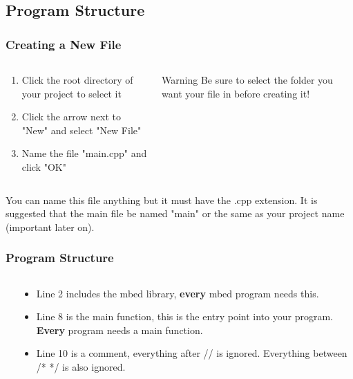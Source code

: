 \subsection{Program Structure}
\label{sub:program_structure}
\begin{frame}
	\frametitle{Creating a New File}
	\begin{columns}[c]
		\begin{column}{0.5\textwidth}
			\begin{enumerate}
				\item Click the root directory of your project to select it
				\item Click the arrow next to "New" and select "New File"
				\item Name the file "main.cpp" and click "OK"
			\end{enumerate}
		\end{column}
		\begin{column}{0.5\textwidth}
			\begin{block}{Warning}
				Be sure to select the folder you want your file in before creating it!
			\end{block}
		\end{column}
	\end{columns}
	\begin{center}
		You can name this file anything but it must have the .cpp extension.
		It is suggested that the main file be named "main" or the same as your project name (important later on).
	\end{center}
\end{frame}

\begin{frame}
	\frametitle{Program Structure}
	\begin{columns}[T]
		\begin{column}{0.4\textwidth}
			
		\end{column}
		\begin{column}{0.6\textwidth}
			\begin{itemize}
				\item Line 2 includes the mbed library, \textbf{every} mbed program needs this.
				\item Line 8 is the main function, this is the entry point into your program.
					\textbf{Every} program needs a main function.
				\item Line 10 is a comment, everything after // is ignored. Everything between /* */ is also ignored.
			\end{itemize}
		\end{column}
	\end{columns}
\end{frame}